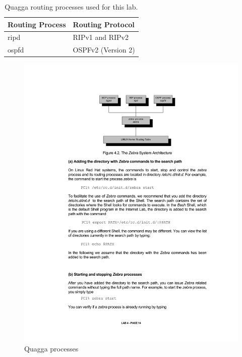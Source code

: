 \begin{table}[h!t]
	\centering
	\begin{tabular}{| l l |}	
		\hline
		\textbf{Routing Process} & \textbf{Routing Protocol}\\ \hline
		ripd & RIPv1 and RIPv2 \\
		ospfd & OSPFv2 (Version 2) \\ \hline
	\end{tabular}
	\caption{Quagga routing processes used for this lab.}
	\label{tab:quagga}
\end{table}

\begin{figure}[h]
	\centering
	\includegraphics[width=0.7\linewidth]{graphics/quagga.pdf}	
	\caption{Quagga processes}
	\label{fig:quagga}
\end{figure}


